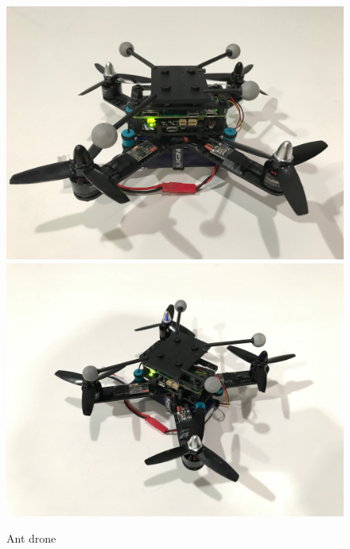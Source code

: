 \begin{figure}[!htb]
  \includegraphics[width=\linewidth]{chapters/chapter-03/figures/ant1_1.jpg}
\endminipage\hfill
{}
  \includegraphics[width=\linewidth]{chapters/chapter-03/figures/ant1_2.jpg}
\endminipage
\caption{Ant drone}
\label{fig:ant1}
\end{figure}

